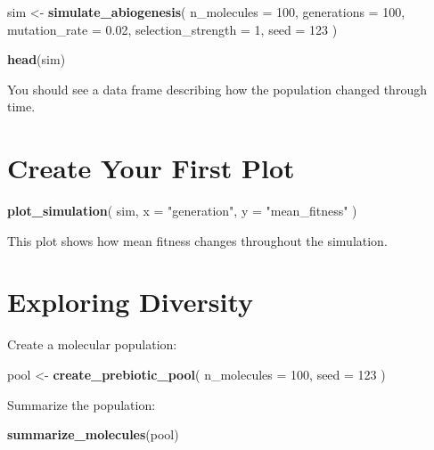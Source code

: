 \documentclass[
  oneside,
  openany]{book}
\newenvironment{Shaded}{\begin{snugshade}}{\end{snugshade}}
\newcommand{\AttributeTok}[1]{\textcolor[rgb]{0.13,0.29,0.53}{#1}}
\newcommand{\DecValTok}[1]{\textcolor[rgb]{0.00,0.00,0.81}{#1}}
\newcommand{\FloatTok}[1]{\textcolor[rgb]{0.00,0.00,0.81}{#1}}
\newcommand{\FunctionTok}[1]{\textcolor[rgb]{0.13,0.29,0.53}{\textbf{#1}}}
\newcommand{\NormalTok}[1]{#1}
\newcommand{\OtherTok}[1]{\textcolor[rgb]{0.56,0.35,0.01}{#1}}
\newcommand{\StringTok}[1]{\textcolor[rgb]{0.31,0.60,0.02}{#1}}
\begin{document}
\begin{Shaded}
\begin{Highlighting}[]
\NormalTok{sim }\OtherTok{\textless{}{-}} \FunctionTok{simulate\_abiogenesis}\NormalTok{(}
  \AttributeTok{n\_molecules =} \DecValTok{100}\NormalTok{,}
  \AttributeTok{generations =} \DecValTok{100}\NormalTok{,}
  \AttributeTok{mutation\_rate =} \FloatTok{0.02}\NormalTok{,}
  \AttributeTok{selection\_strength =} \DecValTok{1}\NormalTok{,}
  \AttributeTok{seed =} \DecValTok{123}
\NormalTok{)}

\FunctionTok{head}\NormalTok{(sim)}
\end{Highlighting}
\end{Shaded}

You should see a data frame describing how the population changed through time.

\section{Create Your First Plot}\label{create-your-first-plot}

\begin{Shaded}
\begin{Highlighting}[]
\FunctionTok{plot\_simulation}\NormalTok{(}
\NormalTok{  sim,}
  \AttributeTok{x =} \StringTok{"generation"}\NormalTok{,}
  \AttributeTok{y =} \StringTok{"mean\_fitness"}
\NormalTok{)}
\end{Highlighting}
\end{Shaded}

This plot shows how mean fitness changes throughout the simulation.

\section{Exploring Diversity}\label{exploring-diversity}

Create a molecular population:

\begin{Shaded}
\begin{Highlighting}[]
\NormalTok{pool }\OtherTok{\textless{}{-}} \FunctionTok{create\_prebiotic\_pool}\NormalTok{(}
  \AttributeTok{n\_molecules =} \DecValTok{100}\NormalTok{,}
  \AttributeTok{seed =} \DecValTok{123}
\NormalTok{)}
\end{Highlighting}
\end{Shaded}

Summarize the population:

\begin{Shaded}
\begin{Highlighting}[]
\FunctionTok{summarize\_molecules}\NormalTok{(pool)}
\end{Highlighting}
\end{Shaded}
\end{document}
